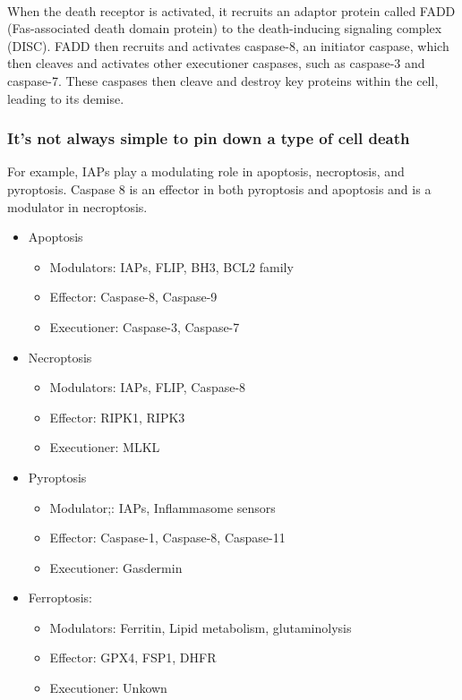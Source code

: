 \begin{itemize}
\begin{itemize}
\\When the death receptor is activated, it recruits an adaptor protein called FADD (Fas-associated death domain protein) to the death-inducing signaling complex (DISC). FADD then recruits and activates caspase-8, an initiator caspase, which then cleaves and activates other executioner caspases, such as caspase-3 and caspase-7. These caspases then cleave and destroy key proteins within the cell, leading to its demise.

\subsubsection{It's not always simple to pin down a type of cell death}
For example, IAPs play a modulating role in apoptosis, necroptosis, and pyroptosis. Caspase 8 is an effector in both pyroptosis and apoptosis and is a modulator in necroptosis.
\begin{itemize}
    \item Apoptosis
    \begin{itemize}
        \item Modulators: IAPs, FLIP, BH3, BCL2 family
        \item Effector: Caspase-8, Caspase-9
        \item Executioner: Caspase-3, Caspase-7
    \end{itemize}
    \item Necroptosis
    \begin{itemize}
        \item Modulators: IAPs, FLIP, Caspase-8
        \item Effector: RIPK1, RIPK3
        \item Executioner: MLKL
        
    \end{itemize}
    \item Pyroptosis
    \begin{itemize}
        \item Modulator;: IAPs, Inflammasome sensors
        \item Effector: Caspase-1, Caspase-8, Caspase-11
        \item Executioner: Gasdermin
    \end{itemize}
    \item Ferroptosis:
    \begin{itemize}
        \item Modulators: Ferritin, Lipid metabolism, glutaminolysis
        \item Effector: GPX4, FSP1, DHFR
        \item Executioner: Unkown
    \end{itemize}
\end{itemize}



\end{itemize}
\end{itemize}
